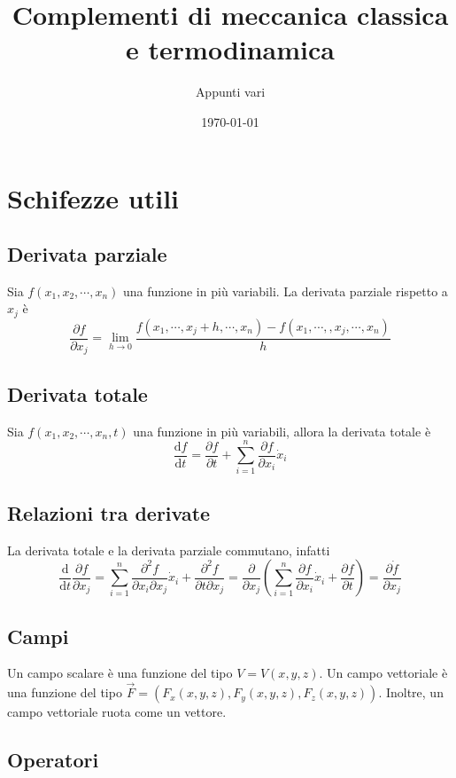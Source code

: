 \documentclass[a4paper,11pt]{article}
\title{Complementi di meccanica classica e termodinamica}
\author{Appunti vari}
\date{\today}
\begin{document}
	\maketitle
\tableofcontents
\newpage

\section{Schifezze utili}
\subsection{Derivata parziale}
Sia $f(x_1,x_2,\cdots,x_n)$ una funzione in più variabili. La derivata parziale rispetto a $x_j$ è
$$\frac{\partial f}{\partial x_j}=\lim\limits_{h\to0}\frac{f(x_1,\cdots,x_j+h,\cdots,x_n)-f(x_1,\cdots,,x_j,\cdots,x_n)}{h}$$
\subsection{Derivata totale}

Sia $f(x_1,x_2,\cdots,x_n,t)$ una funzione in più variabili, allora la derivata totale è
$$\frac{\mathrm{d}f}{\mathrm{d}t}=\frac{\partial f}{\partial t}+\sum_{i=1}^{n}\frac{\partial f}{\partial x_i}\dot{x}_i$$
\subsection{Relazioni tra derivate}

\noindent La derivata totale e la derivata parziale commutano, infatti
$$\frac{\mathrm{d}}{\mathrm{d}t}\frac{\partial f}{\partial x_j}=\sum_{i=1}^{n}\frac{\partial^2 f}{\partial x_i \partial x_j}\dot{x}_i+\frac{\partial^2 f}{\partial t \partial x_j}=\frac{\partial}{\partial x_j}\left(\sum_{i=1}^{n}\frac{\partial f}{\partial x_i}\dot{x}_i+\frac{\partial f}{\partial t}\right)=\frac{\partial \dot{f}}{\partial x_j}$$

\subsection{Campi}

\noindent Un campo scalare è una funzione del tipo $V=V(x,y,z)$. Un campo vettoriale è una funzione del tipo $\vec{F}=(F_x(x,y,z),F_y(x,y,z),F_z(x,y,z))$. Inoltre, un campo vettoriale ruota come un vettore.

\subsection{Operatori}
\end{document}
